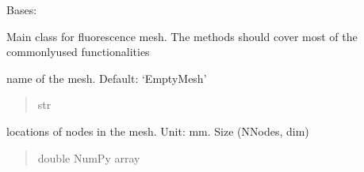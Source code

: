 \documentclass[letterpaper,10pt,english]{sphinxmanual}
\begin{document}
\begin{fulllineitems}
\label{\detokenize{_autosummary/nirfasterff.base.fluor_mesh.fluormesh:nirfasterff.base.fluor_mesh.fluormesh}}
\pysigstartsignatures
\pysigline
{}
\pysigstopsignatures
\sphinxAtStartPar
Bases: 

\sphinxAtStartPar
Main class for fluorescence mesh. The methods should cover most of the commonly\sphinxhyphen{}used functionalities

\begin{fulllineitems}
\label{\detokenize{_autosummary/nirfasterff.base.fluor_mesh.fluormesh:nirfasterff.base.fluor_mesh.fluormesh.name}}
\pysigstartsignatures
\pysigline
{}
\pysigstopsignatures
\sphinxAtStartPar
name of the mesh. Default: ‘EmptyMesh’
\begin{quote}\begin{description}
\sphinxAtStartPar
str

\end{description}\end{quote}

\end{fulllineitems}


\begin{fulllineitems}
\label{\detokenize{_autosummary/nirfasterff.base.fluor_mesh.fluormesh:nirfasterff.base.fluor_mesh.fluormesh.nodes}}
\pysigstartsignatures
\pysigline
{}
\pysigstopsignatures
\sphinxAtStartPar
locations of nodes in the mesh. Unit: mm. Size (NNodes, dim)
\begin{quote}\begin{description}
\sphinxAtStartPar
double NumPy array

\end{description}\end{quote}

\end{fulllineitems}


\end{fulllineitems}
\end{document}
